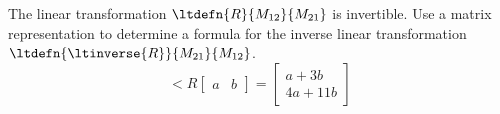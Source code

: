 The linear transformation $\ltdefn{R}{M_{12}}{M_{21}}$ is invertible.  Use a matrix representation to determine a formula for the inverse linear transformation $\ltdefn{\ltinverse{R}}{M_{21}}{M_{12}}$.
\begin{equation*}
\lt{R}{\begin{bmatrix}a & b\end{bmatrix}}
=
\begin{bmatrix}
a+3b\\
4a+11b
\end{bmatrix}
\end{equation*}